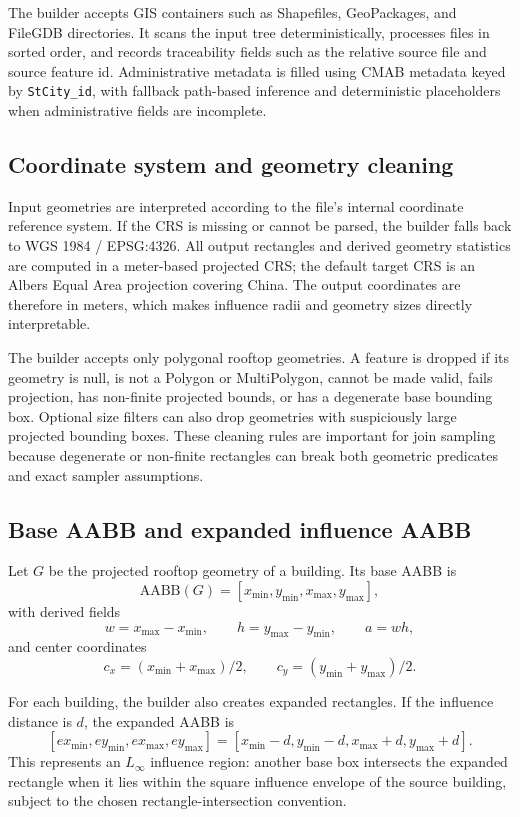 \documentclass[11pt]{article}
\newcommand{\code}[1]{\ifmmode\text{\ttfamily #1}\else\texttt{#1}\fi}
\begin{document}
The builder accepts GIS containers such as Shapefiles, GeoPackages, and FileGDB directories.  It scans the input tree deterministically, processes files in sorted order, and records traceability fields such as the relative source file and source feature id.  Administrative metadata is filled using CMAB metadata keyed by \code{StCity\_id}, with fallback path-based inference and deterministic placeholders when administrative fields are incomplete.

\subsection{Coordinate system and geometry cleaning}

Input geometries are interpreted according to the file's internal coordinate reference system.  If the CRS is missing or cannot be parsed, the builder falls back to WGS 1984 / EPSG:4326.  All output rectangles and derived geometry statistics are computed in a meter-based projected CRS; the default target CRS is an Albers Equal Area projection covering China.  The output coordinates are therefore in meters, which makes influence radii and geometry sizes directly interpretable.

The builder accepts only polygonal rooftop geometries.  A feature is dropped if its geometry is null, is not a Polygon or MultiPolygon, cannot be made valid, fails projection, has non-finite projected bounds, or has a degenerate base bounding box.  Optional size filters can also drop geometries with suspiciously large projected bounding boxes.  These cleaning rules are important for join sampling because degenerate or non-finite rectangles can break both geometric predicates and exact sampler assumptions.

\subsection{Base AABB and expanded influence AABB}

Let $G$ be the projected rooftop geometry of a building.  Its base AABB is
\[
  \mathrm{AABB}(G) = [x_{\min},y_{\min},x_{\max},y_{\max}],
\]
with derived fields
\[
  w=x_{\max}-x_{\min},\qquad
  h=y_{\max}-y_{\min},\qquad
  a=wh,
\]
and center coordinates
\[
  c_x=(x_{\min}+x_{\max})/2,
  \qquad
  c_y=(y_{\min}+y_{\max})/2.
\]

For each building, the builder also creates expanded rectangles.  If the influence distance is $d$, the expanded AABB is
\[
  [e x_{\min}, e y_{\min}, e x_{\max}, e y_{\max}]
  = [x_{\min}-d, y_{\min}-d, x_{\max}+d, y_{\max}+d].
\]
This represents an $L_\infty$ influence region: another base box intersects the expanded rectangle when it lies within the square influence envelope of the source building, subject to the chosen rectangle-intersection convention.
\end{document}
